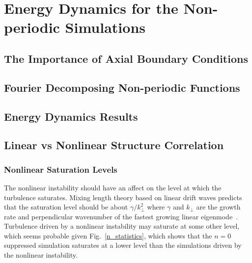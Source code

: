 \chapter{Energy Dynamics for the Non-periodic Simulations}
\label{c_nlin_nonper}

\section{The Importance of Axial Boundary Conditions}
\label{s_axial_bndry}

\section{Fourier Decomposing Non-periodic Functions}
\label{s_fourier_decomp}

\section{Energy Dynamics Results}
\label{s_nonper_en_dyn}

\section{Linear vs Nonlinear Structure Correlation}
\label{s_lin_vs_nlin_struc}


\subsection{Nonlinear Saturation Levels}
\label{ss_nl_sat_levels}

The nonlinear instability should have an affect on the level at which the turbulence saturates. Mixing length theory based on linear drift waves predicts that the saturation level should
be about $\gamma/k_\perp^2$ where $\gamma$ and $k_\perp$ are the growth rate and perpendicular wavenumber of the fastest growing linear eigenmode~\cite{horton1990}. Turbulence driven
by a nonlinear instability may saturate at some other level, which seems probable given Fig.~\ref{n_statistics}, which shows that the $n=0$ suppressed simulation saturates
at a lower level than the simulations driven by the nonlinear instability.

